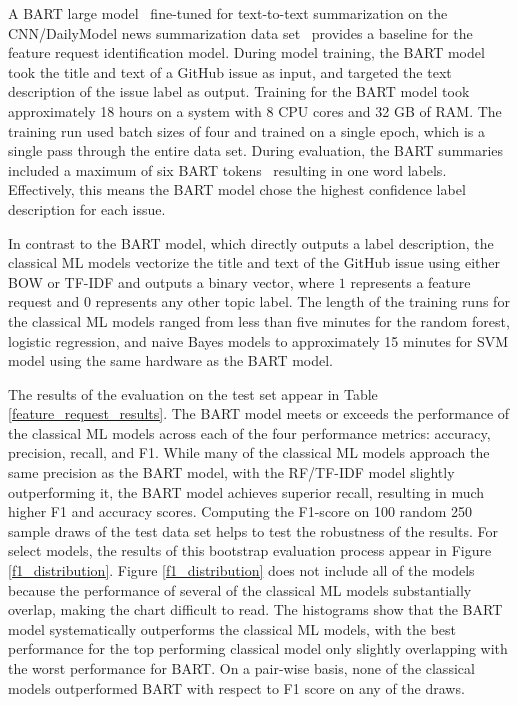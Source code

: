 A BART large model~\cite{bart} fine-tuned for text-to-text summarization on the CNN/DailyModel news summarization data set~\cite{cnn} provides a baseline for the feature request identification model. During model training, the BART model took the title and text of a GitHub issue as input, and targeted the text description of the issue label as output. Training for the BART model took approximately 18 hours on a system with 8 CPU cores and 32 GB of RAM. The training run used batch sizes of four and trained on a single epoch, which is a single pass through the entire data set. During evaluation, the BART summaries included a maximum of six BART tokens~\cite{bart} resulting in one word labels. Effectively, this means the BART model chose the highest confidence label description for each issue.

In contrast to the BART model, which directly outputs a label description, the classical ML models vectorize the title and text of the GitHub issue using either BOW or TF-IDF and outputs a binary vector, where $1$ represents a feature request and $0$ represents any other topic label. The length of the training runs for the classical ML models ranged from less than five minutes for the random forest, logistic regression, and naive Bayes models to approximately 15 minutes for SVM model using the same hardware as the BART model. 

The results of the evaluation on the test set appear in Table \ref{feature_request_results}. The BART model meets or exceeds the performance of the classical ML models across each of the four performance metrics: accuracy, precision, recall, and F1. While many of the classical ML models approach the same precision as the BART model, with the RF/TF-IDF model slightly outperforming it, the BART model achieves superior recall, resulting in much higher F1 and accuracy scores. Computing the F1-score on 100 random 250 sample draws of the test data set helps to test the robustness of the results. For select models, the results of this bootstrap evaluation process appear in Figure \ref{f1_distribution}. Figure \ref{f1_distribution} does not include all of the models because the performance of several of the classical ML models substantially overlap, making the chart difficult to read. The histograms show that the BART model systematically outperforms the classical ML models, with the best performance for the top performing classical model only slightly overlapping with the worst performance for BART. On a pair-wise basis, none of the classical models outperformed BART with respect to F1 score on any of the draws.  

